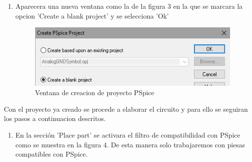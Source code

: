 ﻿\documentclass[letterpaper]{article}
\begin{document}
\begin{large}
\begin{enumerate}
\begin{figure}[htb]
                \label{fig:Menu New project}
            \end{figure}
            \item Aparecera una nueva ventana como la de la figura 3 en la que se marcara la opcion 'Create a blank project' y se selecciona 'Ok'\\
            \begin{figure}[htb]
                \centering
                \includegraphics[scale=0.6]{p3.png}
                \caption{Ventana de creacion de proyecto PSpice}
                \label{fig:Creacion PSpice}
            \end{figure}
        \end{enumerate}
        Con el proyecto ya creado se procede a elaborar el circuito y para ello se seguiran los pasos a continuacion descritos.
        \begin{enumerate}
            \item En la secci\'on 'Place part' se activara el filtro de compatibilidad con PSpice como se muestra en la figura 4. De esta manera solo trabajaremos con piesas compatibles con PSpice.\\
            \begin{figure}[htbp]
                \centering

\end{figure}
\end{enumerate}
\end{large}
\end{document}

